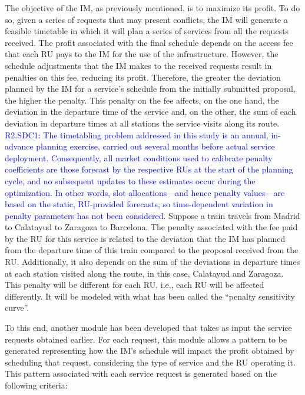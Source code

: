 \documentclass[Afour,sagev,times]{sagej}
\newcommand{\segundo}[1]{\textcolor{blue}{#1}}
\begin{document}
The objective of the IM, as previously mentioned, is to maximize its profit. To do so, given a series of requests that may present conflicts, the \gls{IM} will generate a feasible timetable in which it will plan a series of services from all the requests received. The profit associated with the final schedule depends on the access fee that each \gls{RU} pays to the \gls{IM} for the use of the infrastructure. However, the schedule adjustments that the \gls{IM} makes to the received requests result in penalties on this fee, reducing its profit. Therefore, the greater the deviation planned by the \gls{IM} for a service's schedule from the initially submitted proposal, the higher the penalty. This penalty on the fee affects, on the one hand, the deviation in the departure time of the service and, on the other, the sum of each deviation in departure times at all stations the service visits along its route. \segundo{R2.SDC1: The timetabling problem addressed in this study is an annual, in-advance planning exercise, carried out several months before actual service deployment. Consequently, all market conditions used to calibrate penalty coefficients are those forecast by the respective \glspl{RU} at the start of the planning cycle, and no subsequent updates to these estimates occur during the optimization. In other words, slot allocations—and hence penalty values—are based on the static, \gls{RU}-provided forecasts, so time-dependent variation in penalty parameters has not been considered.} Suppose a train travels from Madrid to Calatayud to Zaragoza to Barcelona. The penalty associated with the fee paid by the \gls{RU} for this service is related to the deviation that the \gls{IM} has planned from the departure time of this train compared to the proposal received from the \gls{RU}. Additionally, it also depends on the sum of the deviations in departure times at each station visited along the route, in this case, Calatayud and Zaragoza. This penalty will be different for each RU, i.e., each \gls{RU} will be affected differently. It will be modeled with what has been called the ``penalty sensitivity curve''.

To this end, another module has been developed that takes as input the service requests obtained earlier. For each request, this module allows a pattern to be generated representing how the IM's schedule will impact the profit obtained by scheduling that request, considering the type of service and the \gls{RU} operating it. This pattern associated with each service request is generated based on the following criteria:
\end{document}
